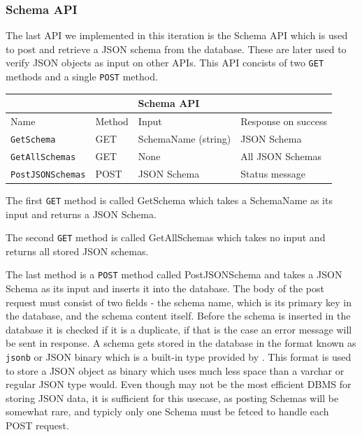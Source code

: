\subsubsection{Schema API}
The last API we implemented in this iteration is the Schema API which is used to post and retrieve a JSON schema from the database. These are later used to verify JSON objects as input on other APIs. 
This API concists of two \texttt{GET} methods and a single \texttt{POST} method. 
\begin{table}[h]
    \begin{tabular}{|llll|}
    \hline
    \multicolumn{4}{|c|}{\textbf{Schema API}}                                                                                                     \\ \hline
    \multicolumn{1}{|l|}{Name}                     & \multicolumn{1}{l|}{Method} & \multicolumn{1}{l|}{Input}               & Response on success \\ \hline
    \multicolumn{1}{|l|}{\texttt{GetSchema}}       & \multicolumn{1}{l|}{GET}    & \multicolumn{1}{l|}{SchemaName (string)} & JSON Schema         \\ \hline
    \multicolumn{1}{|l|}{\texttt{GetAllSchemas}}   & \multicolumn{1}{l|}{GET}    & \multicolumn{1}{l|}{None}                & All JSON Schemas    \\ \hline
    \multicolumn{1}{|l|}{\texttt{PostJSONSchemas}} & \multicolumn{1}{l|}{POST}   & \multicolumn{1}{l|}{JSON Schema}         & Status message      \\ \hline
    \end{tabular}
    \end{table}

The first \texttt{GET} method is called GetSchema which takes a SchemaName as its input and returns a JSON Schema. 

The second \texttt{GET} method is called GetAllSchemas which takes no input and returns all stored JSON schemas. 

The last method is a \texttt{POST} method called PostJSONSchema and takes a JSON Schema as its input and inserts it into the database.
The body of the post request must consist of two fields - the schema name, which is its primary key in the database, and the schema content itself. Before the schema is inserted in the database it is checked if it is a duplicate, if that is the case an error message will be sent in response.
A schema gets stored in the database in the format known as \texttt{jsonb} or JSON binary which is a built-in type provided by \postgres{}.
This format is used to store a JSON object as binary which uses much less space than a varchar or regular JSON type would.
Even though \postgres{} may not be the most efficient DBMS for storing JSON data, it is sufficient for this usecase, as posting Schemas will be somewhat rare, and typicly only one Schema must be fetced to handle each POST request.




